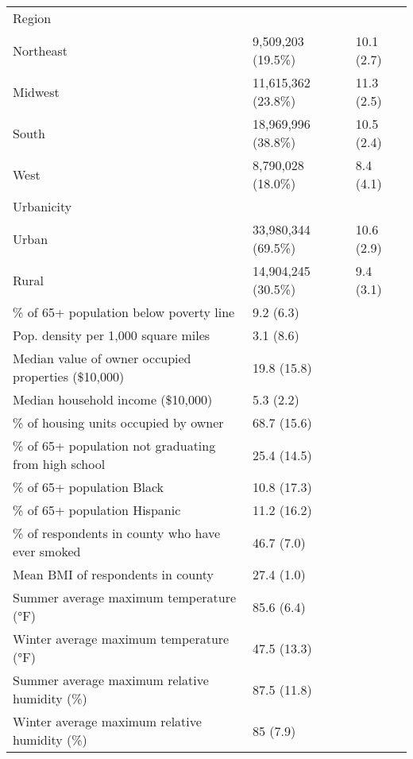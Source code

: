 \begin{table}[ht]
\begin{tabular}{lll}
  Region &  &   \\ 
  \hspace{10pt}Northeast & 9,509,203 (19.5\%) & 10.1 (2.7) \\ 
  \hspace{10pt}Midwest & 11,615,362 (23.8\%) & 11.3 (2.5) \\ 
  \hspace{10pt}South & 18,969,996 (38.8\%) & 10.5 (2.4) \\ 
  \hspace{10pt}West & 8,790,028 (18.0\%) & 8.4 (4.1) \\ 
  Urbanicity &  &   \\ 
  \hspace{10pt}Urban & 33,980,344 (69.5\%) & 10.6 (2.9) \\ 
  \hspace{10pt}Rural & 14,904,245 (30.5\%) & 9.4 (3.1) \\ 
  \% of 65+ population below poverty line & 9.2 (6.3) &   \\ 
  Pop. density per 1,000 square miles & 3.1 (8.6) &   \\ 
  Median value of owner occupied properties (\$10,000) & 19.8 (15.8) &   \\ 
  Median household income (\$10,000) & 5.3 (2.2) &   \\ 
  \% of housing units occupied by owner & 68.7 (15.6) &   \\ 
  \% of 65+ population not graduating from high school & 25.4 (14.5) &   \\ 
  \% of 65+ population Black & 10.8 (17.3) &   \\ 
  \% of 65+ population Hispanic & 11.2 (16.2) &   \\ 
  \% of respondents in county who have ever smoked & 46.7 (7.0) &   \\ 
  Mean BMI of respondents in county & 27.4 (1.0) &   \\ 
  Summer average maximum temperature (°F) & 85.6 (6.4) &   \\ 
  Winter average maximum temperature (°F) & 47.5 (13.3) &   \\ 
  Summer average maximum relative humidity (\%) & 87.5 (11.8) &   \\ 
  Winter average maximum relative humidity (\%) & 85 (7.9) &   \\ 
   \hline
\end{tabular}
\end{table}
